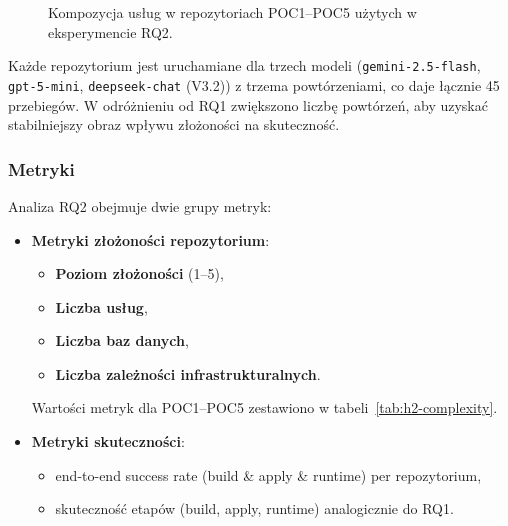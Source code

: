 \begin{figure}[H]
{%
}
\caption{Kompozycja usług w repozytoriach POC1--POC5 użytych w eksperymencie RQ2.}
\label{fig:poc-architectures}
\end{figure}

Każde repozytorium jest uruchamiane dla trzech modeli (\texttt{gemini-2.5-flash}, \texttt{gpt-5-mini}, \texttt{deepseek-chat} (V3.2)) z trzema powtórzeniami, co daje łącznie 45 przebiegów. W odróżnieniu od RQ1 zwiększono liczbę powtórzeń, aby uzyskać stabilniejszy obraz wpływu złożoności na skuteczność.

\subsubsection{Metryki}

Analiza RQ2 obejmuje dwie grupy metryk:
\begin{itemize}
    \item \textbf{Metryki złożoności repozytorium}:
    \begin{itemize}
        \item \textbf{Poziom złożoności} (1–5),
        \item \textbf{Liczba usług},
        \item \textbf{Liczba baz danych},
        \item \textbf{Liczba zależności infrastrukturalnych}.
    \end{itemize}
    Wartości metryk dla POC1--POC5 zestawiono w tabeli~\ref{tab:h2-complexity}.
    \item \textbf{Metryki skuteczności}:
    \begin{itemize}
        \item end-to-end success rate (build \& apply \& runtime) per repozytorium,
        \item skuteczność etapów (build, apply, runtime) analogicznie do RQ1.
    \end{itemize}
\end{itemize}

